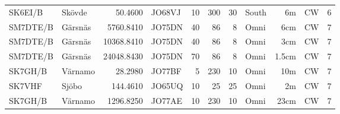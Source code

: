 \begin{longtable}{llrlrrrlrll}
	SK6EI/B  & Skövde              &    50.4600 & JO68VJ &   10 &  300 &   30 & South   &    6m & CW     & 6    \\
	SM7DTE/B & Gärsnäs             &  5760.8410 & JO75DN &   40 &   86 &    8 & Omni    &   6cm & CW     & 7    \\
	SM7DTE/B & Gärsnäs             & 10368.8410 & JO75DN &   40 &   86 &    8 & Omni    &   3cm & CW     & 7    \\
	SM7DTE/B & Gärsnäs             & 24048.8430 & JO75DN &   70 &   86 &    8 & Omni    & 1.5cm & CW     & 7    \\
	SK7GH/B  & Värnamo             &    28.2980 & JO77BF &    5 &  230 &   10 & Omni    &   10m & CW     & 7    \\
	SK7VHF   & Sjöbo               &   144.4610 & JO65UQ &   10 &   25 &   25 & Omni    &    2m & CW     & 7    \\
	SK7GH/B  & Värnamo             &  1296.8250 & JO77AE &   10 &  230 &   10 & Omni    &  23cm & CW     & 7
\end{longtable}

